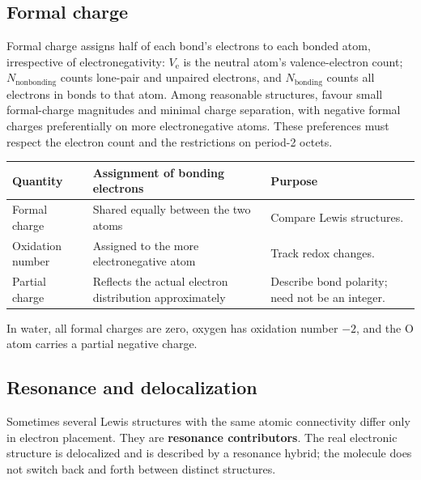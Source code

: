 \documentclass[a4paper,10pt]{article}
\begin{document}
\subsection{Formal charge}
Formal charge assigns half of each bond's electrons to each bonded atom,
irrespective of electronegativity:
$V_{\mathrm e}$ is the neutral atom's valence-electron count;
$N_{\mathrm{nonbonding}}$ counts lone-pair and unpaired electrons, and
$N_{\mathrm{bonding}}$ counts all electrons in bonds to that atom.
Among reasonable structures, favour small formal-charge magnitudes and minimal
charge separation, with negative formal charges preferentially on more
electronegative atoms. These preferences must respect the electron count and
the restrictions on period-2 octets.

\begin{tabularx}{\linewidth}{@{}P{32mm}LL@{}}
\toprule
Quantity & Assignment of bonding electrons & Purpose \\
\midrule
Formal charge & Shared equally between the two atoms & Compare Lewis structures. \\
Oxidation number & Assigned to the more electronegative atom & Track redox changes. \\
Partial charge & Reflects the actual electron distribution approximately & Describe
bond polarity; need not be an integer. \\
\bottomrule
\end{tabularx}

In water, all formal charges are zero, oxygen has oxidation number $-2$,
and the O atom carries a partial negative charge.

\subsection{Resonance and delocalization}
Sometimes several Lewis structures with the same atomic connectivity differ
only in electron placement. They are \textbf{resonance contributors}. The real
electronic structure is delocalized and is described by a resonance hybrid;
the molecule does not switch back and forth between distinct structures.
\end{document}
